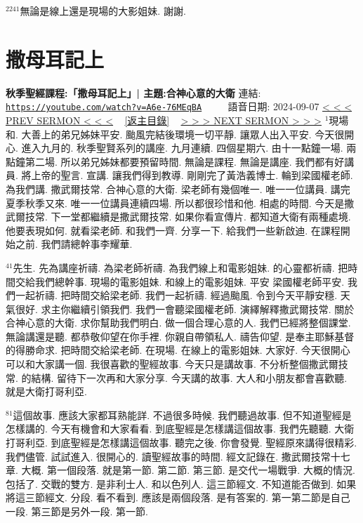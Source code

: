 \documentclass{book}
\begin{document}
$^{2241}$無論是線上還是現場的大影姐妹.
謝謝.
\newpage



\section{撒母耳記上}
\label{sec:A6e_76MEqBA}
\textbf{秋季聖經課程:「撒母耳記上」| 主題:合神心意的大衛}
\newline
\newline
連結: \href{https://youtube.com/watch?v=A6e-76MEqBA}{\texttt{https://youtube.com/watch?v=A6e-76MEqBA}} ~~~~ 語音日期: 2024-09-07
\newline
\newline
\hyperref[sec:ltLox1aivp8]{\small{< < < PREV SERMON < < <}}
~
\hyperref[sec:index]{\small{[返主目錄]}}
~
\hyperref[sec:x3lU8yQeNU8]{\small{> > > NEXT SERMON > > >}}
\newline
\newline
$^{1}$現場和.
大善上的弟兄姊妹平安.
颱風完結後環境一切平靜.
讓眾人出入平安.
今天很開心.
進入九月的.
秋季聖賢系列的講座.
九月連續.
四個星期六.
由十一點鐘一場.
兩點鐘第二場.
所以弟兄姊妹都要預留時間.
無論是課程.
無論是講座.
我們都有好講員.
將上帝的聖言.
宣講.
讓我們得到教導.
剛剛完了黃浩義博士.
輪到梁國權老師.
為我們講.
撒武爾技常.
合神心意的大衛.
梁老師有幾個唯一.
唯一一位講員.
講完夏季秋季又來.
唯一一位講員連續四場.
所以都很珍惜和他.
相處的時間.
今天是撒武爾技常.
下一堂都繼續是撒武爾技常.
如果你看宣傳片.
都知道大衛有兩種處境.
他要表現如何.
就看梁老師.
和我們一齊.
分享一下.
給我們一些新啟迪.
在課程開始之前.
我們請總幹事李耀華.

$^{41}$先生.
先為講座祈禱.
為梁老師祈禱.
為我們線上和電影姐妹.
的心靈都祈禱.
把時間交給我們總幹事.
現場的電影姐妹.
和線上的電影姐妹.
平安 梁國權老師平安.
我們一起祈禱.
把時間交給梁老師.
我們一起祈禱.
經過颱風.
令到今天平靜安穩.
天氣很好.
求主你繼續引領我們.
我們一會聽梁國權老師.
演繹解釋撒武爾技常.
關於合神心意的大衛.
求你幫助我們明白.
做一個合理心意的人.
我們已經將整個課堂.
無論講還是聽.
都恭敬仰望在你手裡.
你親自帶領私人.
禱告仰望.
是奉主耶穌基督的得勝命求.
把時間交給梁老師.
在現場.
在線上的電影姐妹.
大家好.
今天很開心可以和大家講一個.
我很喜歡的聖經故事.
今天只是講故事.
不分析整個撒武爾技常.
的結構.
留待下一次再和大家分享.
今天講的故事.
大人和小朋友都會喜歡聽.
就是大衛打哥利亞.

$^{81}$這個故事.
應該大家都耳熟能詳.
不過很多時候.
我們聽過故事.
但不知道聖經是怎樣講的.
今天有機會和大家看看.
到底聖經是怎樣講這個故事.
我們先聽聽.
大衛打哥利亞.
到底聖經是怎樣講這個故事.
聽完之後.
你會發覺.
聖經原來講得很精彩.
我們儘管.
試試進入.
很開心的.
讀聖經故事的時間.
經文記錄在.
撒武爾技常十七章.
大概.
第一個段落.
就是第一節.
第二節.
第三節.
是交代一場戰爭.
大概的情況.
包括了.
交戰的雙方.
是非利士人.
和以色列人.
這三節經文.
不知道能否做到.
如果將這三節經文.
分段.
看不看到.
應該是兩個段落.
是有答案的.
第一第二節是自己一段.
第三節是另外一段.
第一節.
\end{document}
